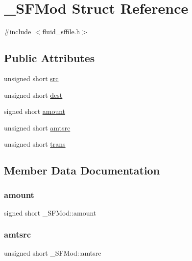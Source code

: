 \hypertarget{struct__SFMod}{}\section{\+\_\+\+S\+F\+Mod Struct Reference}
\label{struct__SFMod}


{\ttfamily \#include $<$fluid\+\_\+sffile.\+h$>$}

\subsection*{Public Attributes}
\begin{DoxyCompactItemize}
\item 
unsigned short \hyperlink{struct__SFMod_a693819d8604ae3f9b892a021e8d38c72}{src}
\item 
unsigned short \hyperlink{struct__SFMod_a166eb7ef238826eb667d692d7ded9abb}{dest}
\item 
signed short \hyperlink{struct__SFMod_ad9cb51a363aaaca0927bf99875cb34a3}{amount}
\item 
unsigned short \hyperlink{struct__SFMod_af6db6b302ac398a51f8573f52455925d}{amtsrc}
\item 
unsigned short \hyperlink{struct__SFMod_aba4b2a221217dd53483f687ccb7c330b}{trans}
\end{DoxyCompactItemize}


\subsection{Member Data Documentation}
\mbox{\label{struct__SFMod_ad9cb51a363aaaca0927bf99875cb34a3}} 
\subsubsection{\texorpdfstring{amount}{amount}}
{\footnotesize\ttfamily signed short \+\_\+\+S\+F\+Mod\+::amount}

\mbox{\label{struct__SFMod_af6db6b302ac398a51f8573f52455925d}} 
\subsubsection{\texorpdfstring{amtsrc}{amtsrc}}
{\footnotesize\ttfamily unsigned short \+\_\+\+S\+F\+Mod\+::amtsrc}

